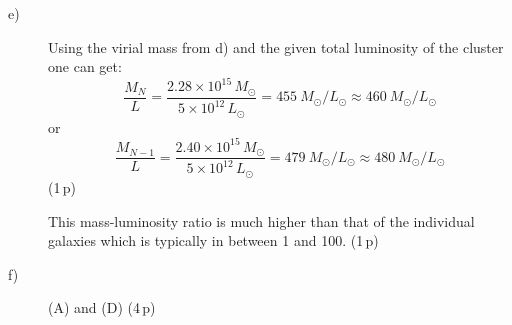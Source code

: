 \begin{description}
\item[e)] Using the virial mass from d) and the given total luminosity of
  the cluster one can get:
  \[ \frac{M_N}{L} = \frac{2.28\times 10^{15}\,M_\odot}
     {5\times 10^{12}\,L_\odot}
     = 455\ M_\odot/L_\odot \approx 460\ M_\odot/L_\odot \]
  or
  \[ \frac{M_{N-1}}{L} = \frac{2.40\times 10^{15}\,M_\odot}
     {5\times 10^{12}\,L_\odot}
     = 479\ M_\odot/L_\odot \approx 480\ M_\odot/L_\odot \]
  \hfill(1\,p)

  This mass-luminosity ratio is much higher than that of the individual
  galaxies which is typically in between 1 and 100. \hfill(1\,p)

\item[f)] (A) and (D) \hfill(4\,p)
\end{description}
